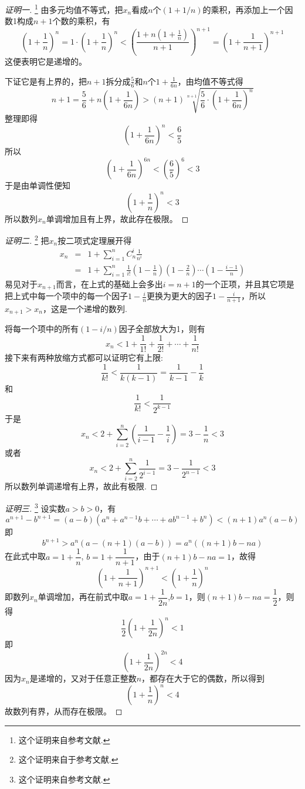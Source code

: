 \begin{proof}[证明一]\footnote{这个证明来自参考文献\cite{olympic-math}.}
  由多元均值不等式，把$x_n$看成$n$个$(1+1/n)$的乘积，再添加上一个因数1构成$n+1$个数的乘积，有
  \[ \left( 1+\frac{1}{n} \right)^n = 1 \cdot \left( 1+\frac{1}{n} \right)^n < \left( \frac{1+n\left( 1+\frac{1}{n} \right)}{n+1} \right)^{n+1} = \left( 1+\frac{1}{n+1} \right)^{n+1} \]
  这便表明它是递增的。

  下证它是有上界的，把$n+1$拆分成$\frac{5}{6}$和$n$个$1+\frac{1}{6n}$，由均值不等式得
  \[ n+1 = \frac{5}{6} + n \left( 1+\frac{1}{6n} \right) > (n+1)\sqrt[n+1]{\frac{5}{6} \cdot \left( 1+\frac{1}{6n} \right)^n} \]
  整理即得
  \[ \left( 1+\frac{1}{6n} \right)^n < \frac{6}{5} \]
  所以
  \[ \left( 1+\frac{1}{6n} \right)^{6n} < \left( \frac{6}{5} \right)^6 < 3 \]
  于是由单调性便知
  \[ \left( 1+\frac{1}{n} \right)^n < 3 \]
  所以数列$x_n$单调增加且有上界，故此存在极限。
\end{proof}

\begin{proof}[证明二]\footnote{这个证明来自于参考文献\cite{math-analysis}.}
  把$x_n$按二项式定理展开得
  \begin{eqnarray*}
    x_n & = & 1+\sum_{i=1}^n C_n^i \frac{1}{n^i} \\
    & = & 1+ \sum_{i=1}^n \frac{1}{i!}\left( 1-\frac{1}{n} \right) \left( 1-\frac{2}{n} \right)\cdots \left( 1-\frac{i-1}{n} \right)
  \end{eqnarray*}
  易见对于$x_{n+1}$而言，在上式的基础上会多出$i=n+1$的一个正项，并且其它项是把上式中每一个项中的每一个因子$1-\frac{i}{n}$更换为更大的因子$1-\frac{i}{n+1}$，所以$x_{n+1}>x_n$，这是一个递增的数列.

  将每一个项中的所有$(1-i/n)$因子全部放大为1，则有
  \[  x_n < 1+\frac{1}{1!}+\frac{1}{2!}+\cdots+\frac{1}{n!} \]
  接下来有两种放缩方式都可以证明它有上限:
  \[ \frac{1}{k!} < \frac{1}{k(k-1)} = \frac{1}{k-1} - \frac{1}{k} \]
  和
  \[ \frac{1}{k!} < \frac{1}{2^{k-1}} \]
  于是
  \[ x_n < 2 + \sum_{i=2}^n \left( \frac{1}{i-1}-\frac{1}{i} \right) = 3-\frac{1}{n} < 3 \]
  或者
  \[ x_n < 2 + \sum_{i=2}^n \frac{1}{2^{i-1}} = 3-\frac{1}{2^{n-1}} < 3 \]
  所以数列单调递增有上界，故此有极限.
\end{proof}

\begin{proof}[证明三]\footnote{这个证明来自参考文献\cite{math-analysis}.}
  设实数$a>b>0$，有
  \[ a^{n+1}-b^{n+1}=(a-b)(a^n+a^{n-1}b+\cdots+ab^{n-1}+b^n) < (n+1)a^n(a-b) \]
  即
  \begin{equation}
    \label{eq:example-equation-a-n-b-n}
   b^{n+1}>a^n(a-(n+1)(a-b))=a^n((n+1)b-na) 
  \end{equation}
  在此式中取$a=1+\dfrac{1}{n}$, $b=1+\dfrac{1}{n+1}$，由于$(n+1)b-na=1$，故得
  \[ \left( 1+\frac{1}{n+1} \right)^{n+1} < \left( 1+\frac{1}{n} \right)^n \]
  即数列$x_n$单调增加，再在前式中取$a=1+\dfrac{1}{2n}$,$b=1$，则$(n+1)b-na=\dfrac{1}{2}$，则得
  \[ \frac{1}{2} \left( 1 + \frac{1}{2n} \right)^n < 1 \]
  即
  \[ \left( 1 + \frac{1}{2n} \right)^{2n} < 4 \]
  因为$x_n$是递增的，又对于任意正整数$n$，都存在大于它的偶数，所以得到
  \[ \left( 1 + \frac{1}{n} \right)^n < 4 \]
  故数列有界，从而存在极限。
\end{proof}

